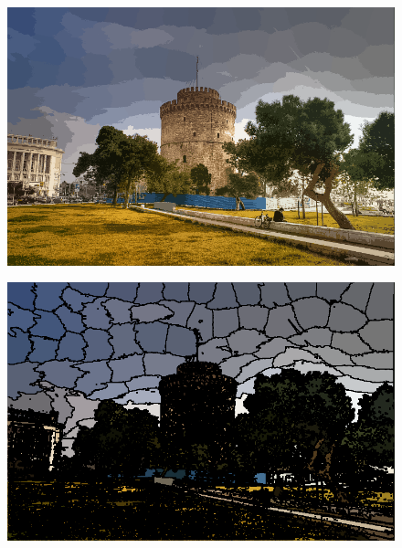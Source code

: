 \documentclass{article}
\begin{document}
\begin{figure}[h!]
\centering
  \includegraphics[scale=0.40]{slic1.png}
\end{figure}


\begin{figure}[h!]
\centering
  \includegraphics[scale=0.40]{slic2.png}
\end{figure}
\end{document}
